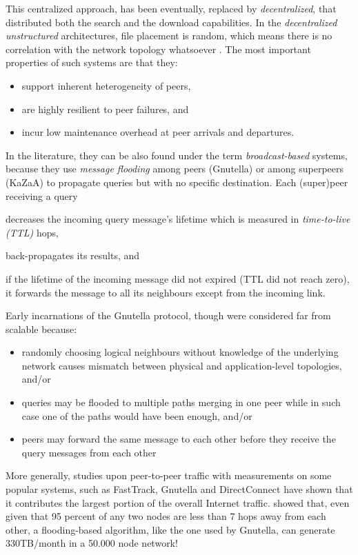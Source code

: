 \documentclass[a4paper,10pt]{article}
\begin{document}
This centralized approach, has been eventually, replaced by \emph{decentralized}, that distributed both the search and the download capabilities. In the \emph{decentralized unstructured} architectures, file placement is random, which means there is no correlation with the network topology whatsoever \cite{yang_improvep2psearch_2002}. The most important properties of such systems are that they:
\begin{itemize}
  \item support inherent heterogeneity of peers,
  \item are highly resilient to peer failures, and
  \item incur low maintenance overhead at peer arrivals and departures.
\end{itemize}
In the literature, they can be also found under the term \emph{broadcast-based} systems, because they use \emph{message flooding} among peers (Gnutella\cite{gnutella}) or among superpeers (KaZaA\cite{kazaa}) to propagate queries but with no specific destination. Each (super)peer receiving a query
\begin{inparaenum}
  \item decreases the incoming query message's lifetime which is measured in \emph{time-to-live (TTL)} hops,
  \item back-propagates its results, and
  \item if the lifetime of the incoming message did not expired (TTL did not reach zero), it forwards the message to all its neighbours except from the incoming link.
\end{inparaenum}
Early incarnations of the Gnutella protocol, though were considered far from scalable \cite{ritter_gnucantscale_2001} because:
\begin{itemize}
  \item randomly choosing logical neighbours without knowledge of the underlying network causes mismatch between physical and application-level topologies, and/or
  \item queries may be flooded to multiple paths merging in one peer while in such case one of the paths would have been enough, and/or
  \item peers may forward the same message to each other before they receive the query messages from each other
\end{itemize}
More generally, studies upon peer-to-peer traffic \cite{seroiu_analysiscds_2002, sen_analyzep2ptraffic_2004} with measurements on some popular systems, such as FastTrack, Gnutella and DirectConnect have shown that it contributes the largest portion of the overall Internet traffic. \cite{matei_mapgnutella_2002} showed that, even given that 95 percent of any two nodes are less than 7 hops away from each other, a flooding-based algorithm, like the one used by Gnutella, can generate 330TB/month in a 50.000 node network!
\end{document}
